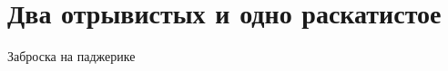 \chapter{Два отрывистых и одно раскатистое}
\vepsianrose

Заброска на паджерике

\begin{center}
\end{center}
